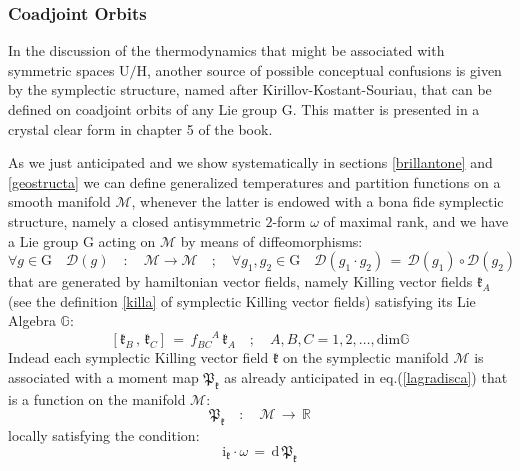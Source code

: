 \documentclass[10pt,a4paper]{article}
\begin{document}
\subsubsection{Coadjoint Orbits}
In the discussion of the thermodynamics that might be associated with symmetric spaces  $\mathrm{U/H}$, another source of possible conceptual confusions  is given by the symplectic structure, named after Kirillov-Kostant-Souriau, that can be defined on coadjoint orbits of any Lie group $\mathrm{G}$.  This matter is presented in a crystal clear form in chapter 5 of the book\cite{coaggiungo}.
\par
As we just anticipated and we show systematically in sections \ref{brillantone} and \ref{geostructa} we can define generalized temperatures and partition functions on
a smooth manifold $\mathcal{M}$, whenever the latter is endowed with a bona fide symplectic structure, namely a closed antisymmetric $2$-form $\omega$ of maximal rank, and we have a Lie group $\mathrm{G}$ acting on $\mathcal{M}$ by means of diffeomorphisms:
\begin{equation}\label{actionG}
  \forall g \in \mathrm{G} \quad  \mathcal{D}(g) \quad: \quad \mathcal{M} \longrightarrow \mathcal{M} \quad ; \quad
  \forall g_1,g_2 \in \mathrm{G} \quad \mathcal{D}(g_1\cdot g_2)\, = \, \mathcal{D}(g_1) \circ \mathcal{D}(g_2)
\end{equation}
 that are generated by hamiltonian vector fields, namely Killing vector fields $\boldsymbol{\mathfrak{k}}_A$ (see the definition  \ref{killa} of symplectic Killing vector fields) satisfying its Lie Algebra $\mathbb{G}$:
  \begin{equation}\label{cartilagine}
    \left[{\boldsymbol{\mathfrak{k}}}_B \, , \, {\boldsymbol{\mathfrak{k}}}_C\right] \, = \, f_{BC}^{\phantom{BC}A} \, {{\boldsymbol{\mathfrak{k}}}_A} \quad; \quad A,B,C = 1,2,\dots,\text{dim}\mathbb{G}
\end{equation}
Indead each symplectic Killing  vector field $\boldsymbol{\mathfrak{k}}$ on the symplectic manifold $\mathcal{M}$ is associated with a moment map $\mathfrak{P}_{\boldsymbol{\mathfrak{k}}}$ as already anticipated in eq.(\ref{lagradisca}) that is a function on the manifold $\mathcal{M}$:
 \begin{equation}\label{momentus}
   \mathfrak{P}_{\boldsymbol{\mathfrak{k}}} \quad : \quad \mathcal{M} \, \longrightarrow \, \mathbb{R}
 \end{equation}
  locally satisfying  the condition:
 \begin{equation}\label{hamiltoncondo}
   \mathrm{i}_{\boldsymbol{\mathfrak{k}}}\cdot \omega \, = \, \mathrm{d} \, \mathfrak{P}_{\boldsymbol{\mathfrak{k}}}
 \end{equation}
\end{document}
